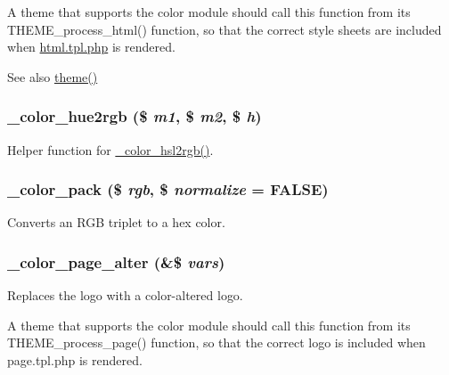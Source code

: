 A theme that supports the color module should call this function from its THEME\_\-process\_\-html() function, so that the correct style sheets are included when \hyperlink{html_8tpl_8php}{html.tpl.php} is rendered.

\begin{DoxySeeAlso}{See also}
\hyperlink{includes_2theme_8inc_a7c25609a935874541a19657affd30fff}{theme()} 
\end{DoxySeeAlso}
\hypertarget{color_8module_a54cc5426150360922c74075fcea9e974}{
\subsubsection[{\_\-color\_\-hue2rgb}]{\setlength{\rightskip}{0pt plus 5cm}\_\-color\_\-hue2rgb (\$ {\em m1}, \/  \$ {\em m2}, \/  \$ {\em h})}}
\label{color_8module_a54cc5426150360922c74075fcea9e974}
Helper function for \hyperlink{color_8module_abfa1f17c627b57e5cb9fc077abd35f73}{\_\-color\_\-hsl2rgb()}. \hypertarget{color_8module_aa35d909dd69c401ec5d88bc32db976e5}{
\subsubsection[{\_\-color\_\-pack}]{\setlength{\rightskip}{0pt plus 5cm}\_\-color\_\-pack (\$ {\em rgb}, \/  \$ {\em normalize} = {\ttfamily FALSE})}}
\label{color_8module_aa35d909dd69c401ec5d88bc32db976e5}
Converts an RGB triplet to a hex color. \hypertarget{color_8module_a8c2fa4b2a829b46046d0c9b3603b761b}{
\subsubsection[{\_\-color\_\-page\_\-alter}]{\setlength{\rightskip}{0pt plus 5cm}\_\-color\_\-page\_\-alter (\&\$ {\em vars})}}
\label{color_8module_a8c2fa4b2a829b46046d0c9b3603b761b}
Replaces the logo with a color-\/altered logo.

A theme that supports the color module should call this function from its THEME\_\-process\_\-page() function, so that the correct logo is included when page.tpl.php is rendered.

